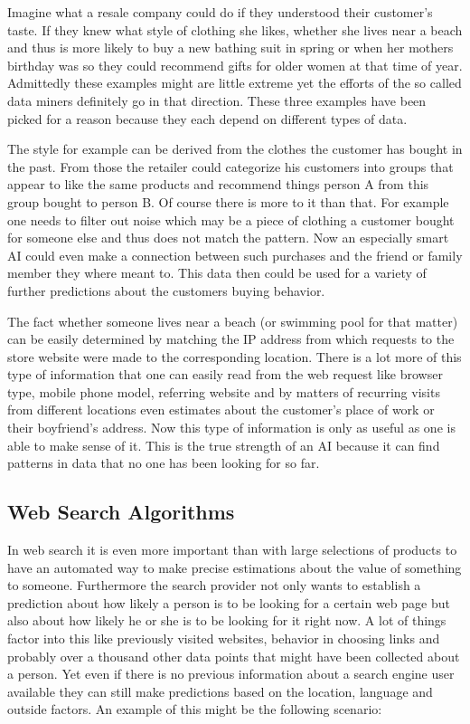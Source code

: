 Imagine what a resale company could do if they understood their customer's taste. If they knew what style of clothing she likes, whether she lives near a beach and thus is more likely to buy a new bathing suit in spring or when her mothers birthday was so they could recommend gifts for older women at that time of year. Admittedly these examples might are little extreme yet the efforts of the so called data miners definitely go in that direction. These three examples have been picked for a reason because they each depend on different types of data.

The style for example can be derived from the clothes the customer has bought in the past. From those the retailer could categorize his customers into groups that appear to like the same products and recommend things person A from this group bought to person B. Of course there is more to it than that. For example one needs to filter out noise which may be a piece of clothing a customer bought for someone else and thus does not match the pattern. Now an especially smart AI could even make a connection between such purchases and the friend or family member they where meant to. This data then could be used for a variety of further predictions about the customers buying behavior.

The fact whether someone lives near a beach (or swimming pool for that matter) can be easily determined by matching the IP address from which requests to the store website were made to the corresponding location. There is a lot more of this type of information that one can easily read from the web request like browser type, mobile phone model, referring website and by matters of recurring visits from different locations even estimates about the customer's place of work or their boyfriend's address. Now this type of information is only as useful as one is able to make sense of it. This is the true strength of an AI because it can find patterns in data that no one has been looking for so far.

\subsection{Web Search Algorithms}

In web search it is even more important than with large selections of products to have an automated way to make precise estimations about the value of something to someone. Furthermore the search provider not only wants to establish a prediction about how likely a person is to be looking for a certain web page but also about how likely he or she is to be looking for it right now. A lot of things factor into this like previously visited websites, behavior in choosing links and probably over a thousand other data points that might have been collected about a person. Yet even if there is no previous information about a search engine user available they can still make predictions based on the location, language and outside factors. An example of this might be the following scenario:

